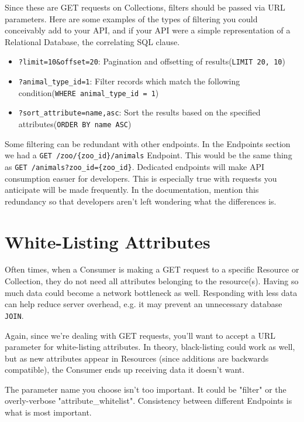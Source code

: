 \documentclass{book}
\begin{document}
Since these are GET requests on Collections, filters should be passed via URL parameters. Here are some examples of the types of filtering you could conceivably add to your API, and if your API were a simple representation of a Relational Database, the correlating SQL clause.

\begin{itemize}
\item \texttt{?limit=10\&offset=20}: Pagination and offsetting of results\newline{}(\texttt{LIMIT 20, 10})
\item \texttt{?animal\_type\_id=1}: Filter records which match the following condition\newline{}(\texttt{WHERE animal\_type\_id = 1})
\item \texttt{?sort\_attribute=name,asc}: Sort the results based on the specified attributes\newline{}(\texttt{ORDER BY name ASC})
\end{itemize}

Some filtering can be redundant with other endpoints. In the Endpoints section we had a \texttt{GET /zoo/\{zoo\_id\}/animals} Endpoint. This would be the same thing as \texttt{GET /animals?zoo\_id=\{zoo\_id\}}. Dedicated endpoints will make API consumption easuer for developers. This is especially true with requests you anticipate will be made frequently. In the documentation, mention this redundancy so that developers aren't left wondering what the differences is.


\section{White-Listing Attributes}

Often times, when a Consumer is making a GET request to a specific Resource or Collection, they do not need all attributes belonging to the resource(s). Having so much data could become a network bottleneck as well. Responding with less data can help reduce server overhead, e.g. it may prevent an unnecessary database \texttt{JOIN}.

Again, since we're dealing with GET requests, you'll want to accept a URL parameter for white-listing attributes. In theory, black-listing could work as well, but as new attributes appear in Resources (since additions are backwards compatible), the Consumer ends up receiving data it doesn't want.

The parameter name you choose isn't too important. It could be "filter" or the overly-verbose "attribute\_whitelist". Consistency between different Endpoints is what is most important.
\end{document}
